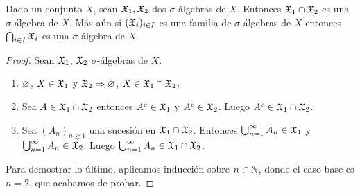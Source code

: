 \begin{lemma}
    Dado un conjunto $X$, sean $\mathfrak{X}_1, \mathfrak{X}_2$ dos $\sigma$-álgebras de $X$. Entonces $\mathfrak{X}_1 \cap \mathfrak{X}_2$ es una $\sigma$-álgebra de $X$.
    Más aún si $(\mathfrak{X}_i)_{i \in I}$ es una familia de $\sigma$-álgebras de $X$ entonces $\bigcap_{i \in I} \mathfrak{X}_i$ es una $\sigma$-álgebra de $X$.
    \begin{proof}
        Sean $\mathfrak{X}_1$, $\mathfrak{X}_2$ $\sigma$-álgebras de $X$.
        \begin{enumerate}
            \item $\varnothing$, $X \in \mathfrak{X}_1$ y $\mathfrak{X}_2 \Rightarrow \varnothing$, $X \in \mathfrak{X}_1 \cap \mathfrak{X}_2$.
            \item Sea $A \in \mathfrak{X}_1 \cap \mathfrak{X}_2$ entonces $A^c \in \mathfrak{X}_1$ y $A^c \in \mathfrak{X}_2$.
                  Luego $A^c \in \mathfrak{X}_1 \cap \mathfrak{X}_2$.
            \item Sea $(A_n)_{n \geq 1}$ una sucesión en $\mathfrak{X}_1 \cap \mathfrak{X}_2$. Entonces $\bigcup_{n=1}^{\infty} A_n \in \mathfrak{X}_1$ y $\bigcup_{n=1}^{\infty} A_n \in \mathfrak{X}_2$.
                  Luego $\bigcup_{n=1}^{\infty} A_n \in \mathfrak{X}_1 \cap \mathfrak{X}_2$.
        \end{enumerate}
        Para demostrar lo último, aplicamos inducción sobre $n \in \mathbb{N}$, donde el caso base es $n = 2$, que acabamos de probar.
    \end{proof}
\end{lemma}

